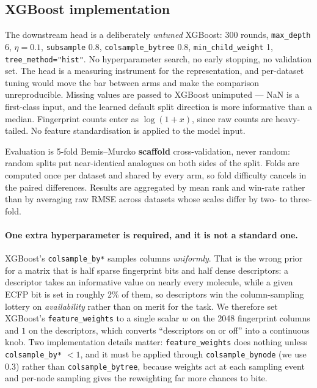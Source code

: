 \subsection{XGBoost implementation}


The downstream head is a deliberately \emph{untuned} XGBoost: 300 rounds, \texttt{max\_depth} 6,
$\eta = 0.1$, \texttt{subsample} 0.8, \texttt{colsample\_bytree} 0.8,
\texttt{min\_child\_weight} 1, \texttt{tree\_method="hist"}. No hyperparameter search, no early
stopping, no validation set. The head is a measuring instrument for the representation, and
per-dataset tuning would move the bar between arms and make the comparison unreproducible.
Missing values are passed to XGBoost unimputed --- NaN is a first-class input, and the learned
default split direction is more informative than a median. Fingerprint counts enter as
$\log(1+x)$, since raw counts are heavy-tailed. No feature standardisation is applied to the
model input.

Evaluation is 5-fold Bemis--Murcko \textbf{scaffold} cross-validation, never random: random
splits put near-identical analogues on both sides of the split. Folds are computed once per
dataset and shared by every arm, so fold difficulty cancels in the paired differences. Results
are aggregated by mean rank and win-rate rather than by averaging raw RMSE across datasets
whose scales differ by two- to three-fold.

\paragraph{One extra hyperparameter is required, and it is not a standard one.} XGBoost's
\texttt{colsample\_by*} samples columns \emph{uniformly}. That is the wrong prior for a matrix
that is half sparse fingerprint bits and half dense descriptors: a descriptor takes an
informative value on nearly every molecule, while a given ECFP bit is set in roughly 2\% of
them, so descriptors win the column-sampling lottery on \emph{availability} rather than on merit
for the task. We therefore set XGBoost's \texttt{feature\_weights} to a single scalar $w$ on the
2048 fingerprint columns and $1$ on the descriptors, which converts ``descriptors on or off''
into a continuous knob. Two implementation details matter: \texttt{feature\_weights} does
nothing unless \texttt{colsample\_by*} $< 1$, and it must be applied through
\texttt{colsample\_bynode} (we use $0.3$) rather than \texttt{colsample\_bytree}, because
weights act at each sampling event and per-node sampling gives the reweighting far more chances
to bite.

